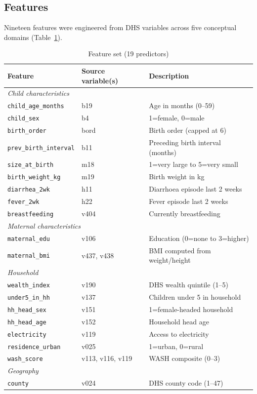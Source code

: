 \documentclass[12pt, a4paper]{article}
\begin{document}
\subsection{Features}
Nineteen features were engineered from DHS variables across five
conceptual domains (Table~\ref{tab:features}).

\begin{table}[H]
\centering
\caption{Feature set (19 predictors)}
\label{tab:features}
\footnotesize
\begin{tabular}{lll}
\toprule
\textbf{Feature} & \textbf{Source variable(s)} & \textbf{Description} \\
\midrule
\multicolumn{3}{l}{\textit{Child characteristics}} \\
\texttt{child\_age\_months}    & b19  & Age in months (0–59) \\
\texttt{child\_sex}            & b4   & 1=female, 0=male \\
\texttt{birth\_order}          & bord & Birth order (capped at 6) \\
\texttt{prev\_birth\_interval} & b11  & Preceding birth interval (months) \\
\texttt{size\_at\_birth}       & m18  & 1=very large to 5=very small \\
\texttt{birth\_weight\_kg}     & m19  & Birth weight in kg \\
\texttt{diarrhea\_2wk}         & h11  & Diarrhoea episode last 2 weeks \\
\texttt{fever\_2wk}            & h22  & Fever episode last 2 weeks \\
\texttt{breastfeeding}         & v404 & Currently breastfeeding \\
\midrule
\multicolumn{3}{l}{\textit{Maternal characteristics}} \\
\texttt{maternal\_edu}         & v106 & Education (0=none to 3=higher) \\
\texttt{maternal\_bmi}         & v437, v438 & BMI computed from weight/height \\
\midrule
\multicolumn{3}{l}{\textit{Household}} \\
\texttt{wealth\_index}         & v190  & DHS wealth quintile (1–5) \\
\texttt{under5\_in\_hh}        & v137  & Children under 5 in household \\
\texttt{hh\_head\_sex}         & v151  & 1=female-headed household \\
\texttt{hh\_head\_age}         & v152  & Household head age \\
\texttt{electricity}           & v119  & Access to electricity \\
\texttt{residence\_urban}      & v025  & 1=urban, 0=rural \\
\texttt{wash\_score}           & v113, v116, v119 & WASH composite (0–3) \\
\midrule
\multicolumn{3}{l}{\textit{Geography}} \\
\texttt{county}                & v024 & DHS county code (1–47) \\
\bottomrule
\end{tabular}
\end{table}
\end{document}
